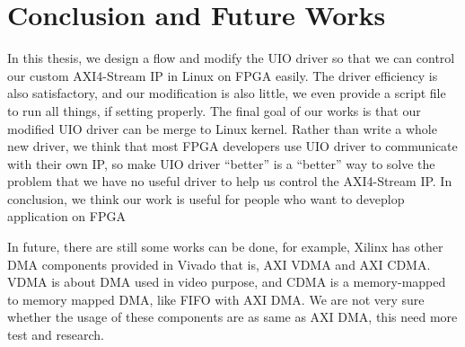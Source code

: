 \chapter{Conclusion and Future Works}
\label{cha:conclusion and Future Works}

In this thesis, we design a flow and modify the UIO driver so that we can control our custom AXI4-Stream IP in Linux on FPGA easily. The driver efficiency is also satisfactory, and our modification is also little, we even provide a script file to run all things, if setting properly. The final goal of our works is that our modified UIO driver can be merge to Linux kernel. Rather than write a whole new driver, we think that most FPGA developers use UIO driver to communicate with their own IP, so make UIO driver ``better'' is a ``better'' way to solve the problem that we have no useful driver to help us control the AXI4-Stream IP. In conclusion, we think our work is useful for people who want to deveplop application on FPGA

In future, there are still some works can be done, for example, Xilinx has other DMA components provided in Vivado that is, AXI VDMA and AXI CDMA. VDMA is about DMA used in video purpose, and CDMA is a memory-mapped to memory mapped DMA, like FIFO with AXI DMA. We are not very sure whether the usage of these components are as same as AXI DMA, this need more test and research. 





